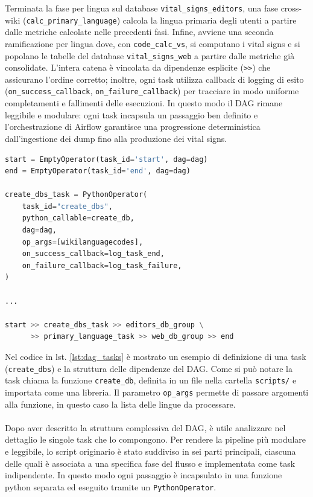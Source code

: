 Terminata la fase per lingua sul database \texttt{vital\_signs\_editors}, una fase cross-wiki (\texttt{calc\_primary\_language})
 calcola la lingua primaria degli utenti a partire dalle metriche calcolate nelle precedenti fasi.
Infine, avviene una seconda ramificazione per lingua dove, con \texttt{code\_calc\_vs}, si computano i vital signs e si popolano le tabelle del database \texttt{vital\_signs\_web} a partire dalle metriche già consolidate.
L’intera catena è vincolata da dipendenze esplicite (\texttt{>>}) che assicurano l’ordine corretto; inoltre, ogni task utilizza callback di logging di esito (\texttt{on\_success\_callback}, \texttt{on\_failure\_callback}) per tracciare in modo uniforme completamenti e fallimenti delle esecuzioni.
In questo modo il DAG rimane leggibile e modulare: ogni task incapsula un passaggio ben definito e l’orchestrazione di Airflow garantisce una progressione deterministica dall’ingestione dei dump fino alla produzione dei vital signs.


\begin{lstlisting}[language=Python, caption={Esempio di definizione di una task e dipendenze del DAG}, label=lst:dag_tasks, basicstyle=\scriptsize\ttfamily]
start = EmptyOperator(task_id='start', dag=dag)
end = EmptyOperator(task_id='end', dag=dag)

create_dbs_task = PythonOperator(
    task_id="create_dbs",
    python_callable=create_db,
    dag=dag,
    op_args=[wikilanguagecodes],
    on_success_callback=log_task_end,
    on_failure_callback=log_task_failure,
)

...

start >> create_dbs_task >> editors_db_group \
      >> primary_language_task >> web_db_group >> end
\end{lstlisting}

Nel codice in lst. \ref{lst:dag_tasks} è mostrato un esempio di definizione di una task (\texttt{create\_dbs}) e la struttura delle dipendenze del DAG.
Come si può notare la task chiama la funzione \texttt{create\_db}, definita in un file nella cartella \texttt{scripts/} e importata come una libreria.
Il parametro \texttt{op\_args} permette di passare argomenti alla funzione, in questo caso la lista delle lingue da processare.
\paragraph{}
Dopo aver descritto la struttura complessiva del DAG, è utile analizzare nel dettaglio le singole task che lo compongono.
Per rendere la pipeline più modulare e leggibile, lo script originario è stato suddiviso in sei parti principali, ciascuna delle quali è associata a una specifica fase del flusso e implementata come task indipendente. In questo modo ogni passaggio è incapsulato in una funzione python separata ed eseguito tramite un \texttt{PythonOperator}.

